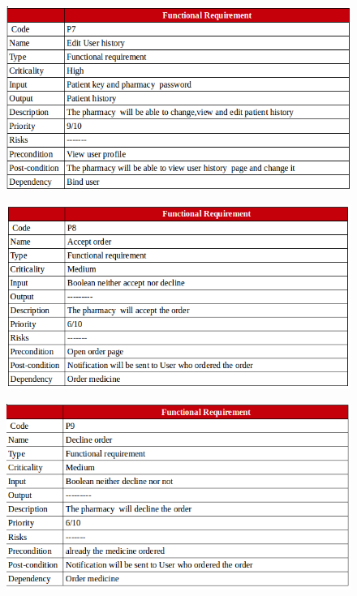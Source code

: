 \documentclass[]{article}
\begin{document}
\begin{figure}[H]
\centering
\includegraphics[scale=0.4]{./f/27}
\end{figure}

\begin{figure}[H]
\centering
\includegraphics[scale=0.4]{./f/28}
\end{figure}

\begin{figure}[H]
\centering
\includegraphics[scale=0.4]{./f/29}
\end{figure}
\end{document}

